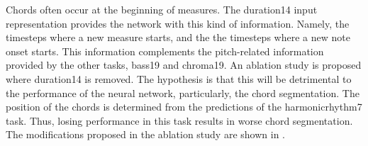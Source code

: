 
Chords often occur at the beginning of measures. The
\gls{duration14} input representation provides the network
with this kind of information. Namely, the timesteps where a
new measure starts, and the the timesteps where a new note
onset starts. This information complements the pitch-related
information provided by the other tasks, \gls{bass19} and
\gls{chroma19}. An ablation study is proposed where
\gls{duration14} is removed. The hypothesis is that this
will be detrimental to the performance of the neural
network, particularly, the chord segmentation. The position
of the chords is determined from the predictions of the
\gls{harmonicrhythm7} task. Thus, losing performance in this
task results in worse chord segmentation. The modifications
proposed in the ablation study are shown in
.

